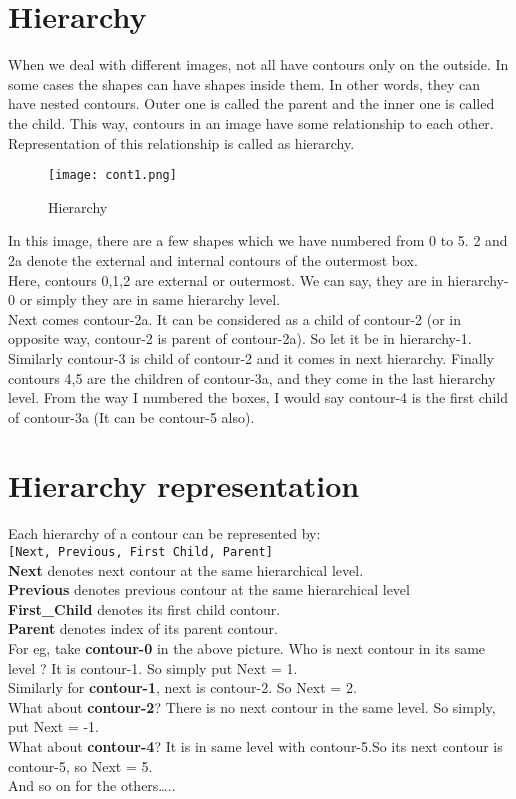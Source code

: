 \documentclass[]{article}
\begin{document}
\section{Hierarchy}\label{hierarchy}

When we deal with different images, not all have contours only on the
outside. In some cases the shapes can have shapes inside them. In other
words, they can have nested contours. Outer one is called the parent and
the inner one is called the child. This way, contours in an image have
some relationship to each other. Representation of this relationship is
called as hierarchy.

\begin{figure}[htbp]
\centering
\texttt{[image: cont1.png]}
\caption{Hierarchy}
\end{figure}

In this image, there are a few shapes which we have numbered from 0 to
5. 2 and 2a denote the external and internal contours of the outermost
box.\\
Here, contours 0,1,2 are external or outermost. We can say, they are in
hierarchy-0 or simply they are in same hierarchy level.\\
Next comes contour-2a. It can be considered as a child of contour-2 (or
in opposite way, contour-2 is parent of contour-2a). So let it be in
hierarchy-1. Similarly contour-3 is child of contour-2 and it comes in
next hierarchy. Finally contours 4,5 are the children of contour-3a, and
they come in the last hierarchy level. From the way I numbered the
boxes, I would say contour-4 is the first child of contour-3a (It can be
contour-5 also).

\section{Hierarchy representation}\label{hierarchy-representation}

Each hierarchy of a contour can be represented by:\\
\texttt{{[}Next,\ Previous,\ First\ Child,\ Parent{]}}\\
\textbf{Next} denotes next contour at the same hierarchical level.\\
\textbf{Previous} denotes previous contour at the same hierarchical
level\\
\textbf{First\_Child} denotes its first child contour.\\
\textbf{Parent} denotes index of its parent contour.\\
For eg, take \textbf{contour-0} in the above picture. Who is next
contour in its same level ? It is contour-1. So simply put Next = 1.\\
Similarly for \textbf{contour-1}, next is contour-2. So Next = 2.\\
What about \textbf{contour-2}? There is no next contour in the same
level. So simply, put Next = -1.\\
What about \textbf{contour-4}? It is in same level with contour-5.So its
next contour is contour-5, so Next = 5.\\
And so on for the others\ldots{}..
\end{document}
